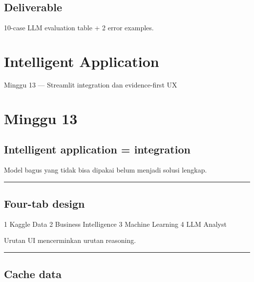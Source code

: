 \documentclass[
  indonesian,
  letterpaper,
  DIV=11,
  numbers=noendperiod]{scrreprt}
\newenvironment{Shaded}{\begin{snugshade}}{\end{snugshade}}
\newcommand{\NormalTok}[1]{\textcolor[rgb]{0.00,0.23,0.31}{#1}}
\begin{document}
\section{Deliverable}\label{deliverable-5}

10-case LLM evaluation table + 2 error examples.

\chapter{Intelligent Application}\label{intelligent-application}

Minggu 13 --- Streamlit integration dan evidence-first UX

\hfill\break

\chapter{Minggu 13}\label{minggu-13}

\section{Intelligent application =
integration}\label{intelligent-application-integration}

Model bagus yang tidak bisa dipakai belum menjadi solusi lengkap.

\begin{center}\rule{0.5\linewidth}{0.5pt}\end{center}

\section{Four-tab design}\label{four-tab-design}

\begin{Shaded}
\begin{Highlighting}[]
\NormalTok{1 Kaggle Data}
\NormalTok{2 Business Intelligence}
\NormalTok{3 Machine Learning}
\NormalTok{4 LLM Analyst}
\end{Highlighting}
\end{Shaded}

Urutan UI mencerminkan urutan reasoning.

\begin{center}\rule{0.5\linewidth}{0.5pt}\end{center}

\section{Cache data}\label{cache-data}
\end{document}
